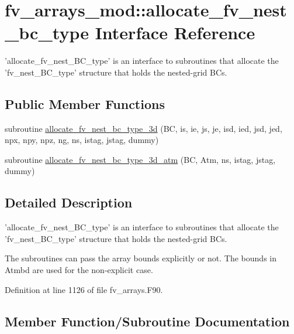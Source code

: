 \section{fv\-\_\-arrays\-\_\-mod\-:\-:allocate\-\_\-fv\-\_\-nest\-\_\-bc\-\_\-type Interface Reference}
\label{interfacefv__arrays__mod_1_1allocate__fv__nest__bc__type}


'allocate\-\_\-fv\-\_\-nest\-\_\-\-B\-C\-\_\-type' is an interface to subroutines that allocate the 'fv\-\_\-nest\-\_\-\-B\-C\-\_\-type' structure that holds the nested-\/grid B\-Cs.  


\subsection*{Public Member Functions}
\begin{DoxyCompactItemize}
\item 
subroutine \hyperlink{interfacefv__arrays__mod_1_1allocate__fv__nest__bc__type_a25db6ace0eb8ef1331da2fabf640855f}{allocate\-\_\-fv\-\_\-nest\-\_\-bc\-\_\-type\-\_\-3d} (B\-C, is, ie, js, je, isd, ied, jsd, jed, npx, npy, npz, ng, ns, istag, jstag, dummy)
\item 
subroutine \hyperlink{interfacefv__arrays__mod_1_1allocate__fv__nest__bc__type_a198c4b601e12e05fed5528dc3ce7aae1}{allocate\-\_\-fv\-\_\-nest\-\_\-bc\-\_\-type\-\_\-3d\-\_\-atm} (B\-C, Atm, ns, istag, jstag, dummy)
\end{DoxyCompactItemize}


\subsection{Detailed Description}
'allocate\-\_\-fv\-\_\-nest\-\_\-\-B\-C\-\_\-type' is an interface to subroutines that allocate the 'fv\-\_\-nest\-\_\-\-B\-C\-\_\-type' structure that holds the nested-\/grid B\-Cs. 

The subroutines can pass the array bounds explicitly or not. The bounds in Atmbd are used for the non-\/explicit case. 

Definition at line 1126 of file fv\-\_\-arrays.\-F90.



\subsection{Member Function/\-Subroutine Documentation}
